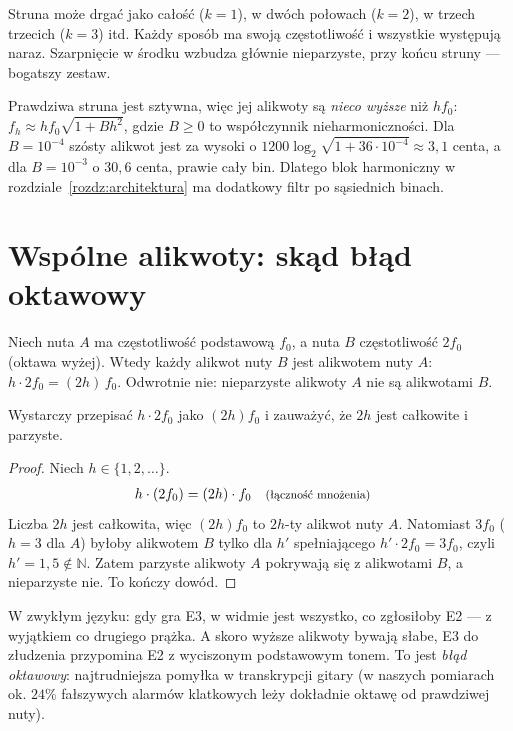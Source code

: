 \begin{intuicja}
Struna może drgać jako całość ($k=1$), w dwóch połowach ($k=2$), w trzech trzecich ($k=3$) itd. Każdy sposób
ma swoją częstotliwość i wszystkie występują naraz. Szarpnięcie w środku wzbudza głównie nieparzyste, przy
końcu struny --- bogatszy zestaw.
\end{intuicja}

\begin{pulapka}
Prawdziwa struna jest sztywna, więc jej alikwoty są \emph{nieco wyższe} niż $hf_0$:
$f_h\approx hf_0\sqrt{1+Bh^2}$, gdzie $B\ge0$ to współczynnik nieharmoniczności. Dla $B=10^{-4}$ szósty alikwot
jest za wysoki o $1200\log_2\sqrt{1+36\cdot10^{-4}}\approx3{,}1$ centa, a dla $B=10^{-3}$ o $30{,}6$ centa, prawie cały
bin. Dlatego blok harmoniczny w rozdziale~\ref{rozdz:architektura} ma dodatkowy filtr po sąsiednich binach.
\end{pulapka}

\section{Wspólne alikwoty: skąd błąd oktawowy}

\begin{twierdzenie}\label{tw:oktawa-alik}
Niech nuta $A$ ma częstotliwość podstawową $f_0$, a nuta $B$ częstotliwość $2f_0$ (oktawa wyżej). Wtedy każdy
alikwot nuty $B$ jest alikwotem nuty $A$: $h\cdot 2f_0=(2h)\,f_0$. Odwrotnie nie: nieparzyste alikwoty $A$ nie
są alikwotami $B$.
\end{twierdzenie}
\begin{pomyslDowodu}
Wystarczy przepisać $h\cdot2f_0$ jako $(2h)f_0$ i zauważyć, że $2h$ jest całkowite i parzyste.
\end{pomyslDowodu}
\begin{proof}
Niech $h\in\{1,2,\dots\}$.
\begin{align*}
h\cdot(2f_0) &= (2h)\cdot f_0 && \text{\footnotesize (łączność mnożenia)}
\end{align*}
Liczba $2h$ jest całkowita, więc $(2h)f_0$ to $2h$-ty alikwot nuty $A$. Natomiast $3f_0$ ($h=3$ dla $A$) byłoby
alikwotem $B$ tylko dla $h'$ spełniającego $h'\cdot2f_0=3f_0$, czyli $h'=1{,}5\notin\mathbb N$. Zatem parzyste
alikwoty $A$ pokrywają się z alikwotami $B$, a nieparzyste nie. To kończy dowód.
\end{proof}

W zwykłym języku: gdy gra E3, w widmie jest wszystko, co zgłosiłoby E2 --- z wyjątkiem co drugiego prążka. A skoro
wyższe alikwoty bywają słabe, E3 do złudzenia przypomina E2 z wyciszonym podstawowym tonem. To jest
\emph{błąd oktawowy}: najtrudniejsza pomyłka w transkrypcji gitary (w naszych pomiarach ok. $24\%$ fałszywych
alarmów klatkowych leży dokładnie oktawę od prawdziwej nuty).

